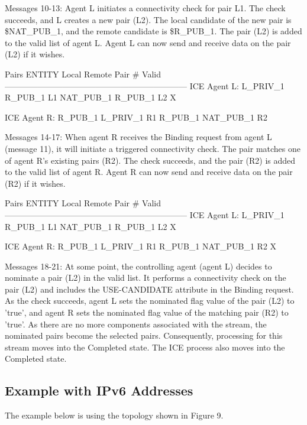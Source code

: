 \documentclass{article}
\begin{document}
Messages 10-13: Agent L initiates a connectivity check for pair L1. The check succeeds, and L creates a new pair (L2).  The local candidate of the new pair is \$NAT\_PUB\_1, and the remote candidate is \$R\_PUB\_1.  The pair (L2) is added to the valid list of agent L. Agent L can now send and receive data on the pair (L2) if it wishes.

Pairs ENTITY                   Local         Remote     Pair \#     Valid ------------------------------------------------------------------ ICE Agent L:             L\_PRIV\_1      R\_PUB\_1       L1 NAT\_PUB\_1     R\_PUB\_1       L2        X

ICE Agent R:             R\_PUB\_1       L\_PRIV\_1      R1 R\_PUB\_1       NAT\_PUB\_1     R2

Messages 14-17: When agent R receives the Binding request from agent L (message 11), it will initiate a triggered connectivity check.  The pair matches one of agent R's existing pairs (R2).  The check succeeds, and the pair (R2) is added to the valid list of agent R. Agent R can now send and receive data on the pair (R2) if it wishes.

Pairs ENTITY                   Local         Remote     Pair \#     Valid ------------------------------------------------------------------ ICE Agent L:             L\_PRIV\_1      R\_PUB\_1       L1 NAT\_PUB\_1     R\_PUB\_1       L2        X

ICE Agent R:             R\_PUB\_1       L\_PRIV\_1      R1 R\_PUB\_1       NAT\_PUB\_1     R2        X

Messages 18-21: At some point, the controlling agent (agent L) decides to nominate a pair (L2) in the valid list.  It performs a connectivity check on the pair (L2) and includes the USE-CANDIDATE attribute in the Binding request.  As the check succeeds, agent L sets the nominated flag value of the pair (L2) to 'true', and agent R sets the nominated flag value of the matching pair (R2) to 'true'. As there are no more components associated with the stream, the nominated pairs become the selected pairs.  Consequently, processing for this stream moves into the Completed state.  The ICE process also moves into the Completed state.

\subsection{Example with IPv6 Addresses}

The example below is using the topology shown in Figure 9.
\end{document}
